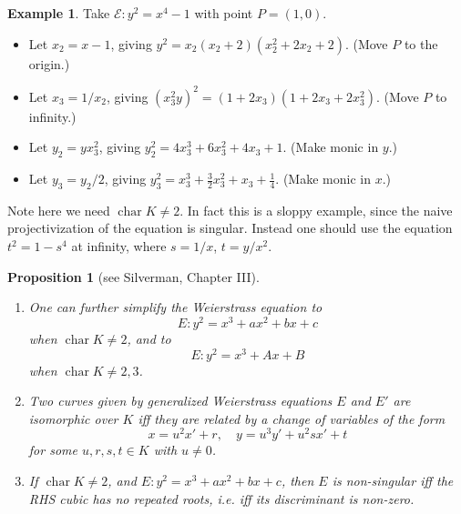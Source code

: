 \documentclass[a4paper]{article}
\newtheorem{proposition}[theorem]{Proposition}
\theoremstyle{definition}
\newtheorem*{example}{Example}
\DeclareMathOperator{\ch}{char}
\newcommand{\E}{\mathcal{E}}
\begin{document}
\begin{example}
    Take $\E:y^2=x^4-1$ with point $P=(1,0)$.
    \begin{itemize}
        \item Let $x_2=x-1$, giving $y^2=x_2(x_2+2)(x_2^2+2x_2+2)$. (Move $P$ to
            the origin.)
        \item Let $x_3=1/x_2$, giving $(x_3^2y)^2=(1+2x_3)(1+2x_3+2x_3^2)$.
            (Move $P$ to infinity.)
        \item Let $y_2=yx_3^2$, giving $y_2^2=4x_3^3+6x_3^2+4x_3+1$. (Make monic
            in $y$.)
        \item Let $y_3=y_2/2$, giving $y_3^2=x_3^3+\frac{3}{2}x_3^2+x_3+\frac{1}{4}$.
            (Make monic in $x$.)
    \end{itemize}
    Note here we need $\ch K\ne2$. In fact this is a sloppy example, since the
    naive projectivization of the equation is singular. Instead one should
    use the equation $t^2=1-s^4$ at infinity, where $s=1/x$, $t=y/x^2$.
\end{example}

\begin{proposition}[see Silverman, Chapter III]
    ~
    \begin{enumerate}[label=(\roman*)]
        \item One can further simplify the Weierstrass equation to
            \begin{equation*}
                E : y^2 = x^3 + ax^2 + bx + c
            \end{equation*}
            when $\ch K\ne2$, and to
            \begin{equation*}
                E : y^2 = x^3 + Ax + B
            \end{equation*}
            when $\ch K\ne2,3$.

        \item Two curves given by generalized Weierstrass equations $E$ and $E'$
            are isomorphic over $K$ iff they are related by a change of
            variables of the form
            \begin{equation*}
                x=u^2x'+r,\quad y=u^3y'+u^2sx'+t
            \end{equation*}
            for some $u,r,s,t\in K$ with $u\ne0$.

        \item If $\ch K\ne2$, and $E:y^2=x^3+ax^2+bx+c$, then $E$ is
            non-singular iff the RHS cubic has no repeated roots, i.e. iff its
            discriminant is non-zero.
    \end{enumerate}
\end{proposition}
\end{document}
